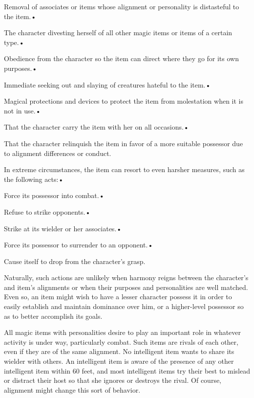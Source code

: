 \documentclass{article}
\begin{document}
\parindent=3pt
Removal of associates or items whose alignment or personality is distasteful to 
the item.• 

The character divesting herself of all other magic items or items of a certain 
type.• 

\parindent=7pt
Obedience from the character so the item can direct where they go for its own purposes.• 

\parindent=3pt
Immediate seeking out and slaying of creatures hateful to the item.• 

Magical protections and devices to protect the item from molestation when it is 
not in use.• 

\parindent=7pt
That the character carry the item with her on all occasions.• 

\parindent=3pt
That the character relinquish the item in favor of a more suitable possessor due 
to alignment differences or conduct.

\parindent=0pt
In extreme circumstances, the item can resort to even harsher measures, such as 
the following acts:• 

\parindent=3pt
Force its possessor into combat.• 

Refuse to strike opponents.• 

\parindent=7pt
Strike at its wielder or her associates.• 

\parindent=3pt
Force its possessor to surrender to an opponent.• 

Cause itself to drop from the character's grasp.

\vspace{12pt}
Naturally, such actions are unlikely when harmony reigns between the character's 
and item's alignments or when their purposes and personalities are well matched. 
Even so, an item might wish to have a lesser character possess it in order to easily 
establish and maintain dominance over him, or a higher-level possessor so as to 
better accomplish its goals.

All magic items with personalities desire to play an important role in whatever 
activity is under way, particularly combat. Such items are rivals of each other, 
even if they are of the same alignment. No intelligent item wants to share its 
wielder with others. An intelligent item is aware of the presence of any other 
intelligent item within 60 feet, and most intelligent items try their best to mislead 
or distract their host so that she ignores or destroys the rival. Of course, alignment 
might change this sort of behavior. 
\end{document}
